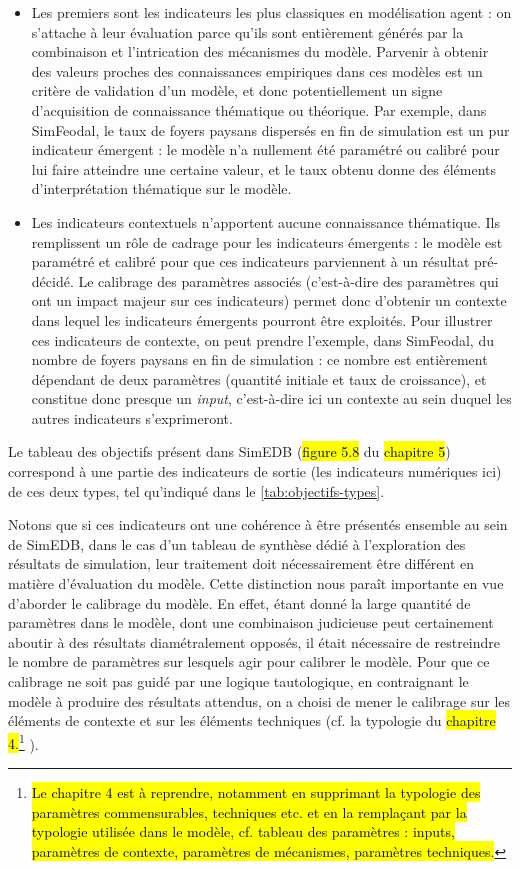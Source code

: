 \begin{itemize}
	\item Les premiers sont les indicateurs les plus classiques en modélisation agent : on s'attache à leur évaluation parce qu'ils sont entièrement générés par la combinaison et l'intrication des mécanismes du modèle.
	Parvenir à obtenir des valeurs proches des connaissances empiriques dans ces modèles est un critère de validation d'un modèle, et donc potentiellement un signe d'acquisition de connaissance thématique ou théorique.
	Par exemple, dans SimFeodal, le taux de foyers paysans dispersés en fin de simulation est un pur indicateur émergent : le modèle n'a nullement été paramétré ou calibré pour lui faire atteindre une certaine valeur, et le taux obtenu donne des éléments d'interprétation thématique sur le modèle.
	\item Les indicateurs contextuels n'apportent aucune connaissance thématique.
	Ils remplissent un rôle de cadrage pour les indicateurs émergents : le modèle est paramétré et calibré pour que ces indicateurs parviennent à un résultat pré-décidé.
	Le calibrage des paramètres associés (c'est-à-dire des paramètres qui ont un impact majeur sur ces indicateurs) permet donc d'obtenir un contexte dans lequel les indicateurs émergents pourront être exploités.
	Pour illustrer ces indicateurs de contexte, on peut prendre l'exemple, dans SimFeodal, du nombre de foyers paysans en fin de simulation : ce nombre est entièrement dépendant de deux paramètres (quantité initiale et taux de croissance), et constitue donc presque un \textit{input}, c'est-à-dire ici un contexte au sein duquel les autres indicateurs s'exprimeront.
\end{itemize}

Le tableau des objectifs présent dans SimEDB (\hl{figure 5.8} du \hl{chapitre 5}) correspond à une partie des indicateurs de sortie (les indicateurs numériques ici) de ces deux types, tel qu'indiqué dans le \cref{tab:objectifs-types}.



Notons que si ces indicateurs ont une cohérence à être présentés ensemble au sein de SimEDB, dans le cas d'un tableau de synthèse dédié à l'exploration des résultats de simulation, leur traitement doit nécessairement être différent en matière d'évaluation du modèle.
Cette distinction nous paraît importante en vue d'aborder le calibrage du modèle.
En effet, étant donné la large quantité de paramètres dans le modèle, dont une combinaison judicieuse peut certainement aboutir à des résultats diamétralement opposés, il était nécessaire de restreindre le nombre de paramètres sur lesquels agir pour calibrer le modèle.
Pour que ce calibrage ne soit pas guidé par une logique tautologique, en contraignant le modèle à produire des résultats attendus, on a choisi de mener le calibrage sur les éléments de contexte et sur les éléments techniques (cf. la typologie du \hl{chapitre 4.}\footnote{
	\hl{Le chapitre 4 est à reprendre, notamment en supprimant la typologie des paramètres commensurables, techniques etc. et en la remplaçant par la typologie utilisée dans le modèle, cf. tableau des paramètres : inputs, paramètres de contexte, paramètres de mécanismes, paramètres techniques.}
}
).

